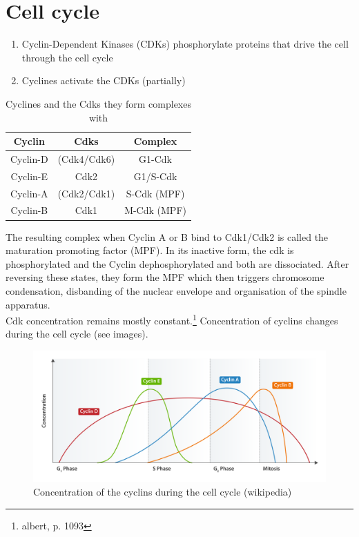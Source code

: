 \documentclass{article}
\begin{document}
	\section{Cell cycle}
	
	\begin{enumerate}[label=\textbullet]
		\item Cyclin-Dependent Kinases (CDKs) phosphorylate proteins that drive the cell through the cell cycle
		\item Cyclines activate the CDKs (partially)
	\end{enumerate}
	
	\begin{table}[h]
		\centering
		\begin{tabular}{|c|c|c|} \hline
			Cyclin & Cdks & Complex \\ \hline
			Cyclin-D & (Cdk4/Cdk6)  & G1-Cdk \\ \hline
			Cyclin-E & Cdk2         & G1/S-Cdk \\ \hline
			Cyclin-A & (Cdk2/Cdk1)  & S-Cdk (MPF) \\ \hline
			Cyclin-B & Cdk1         & M-Cdk (MPF)\\ \hline
		\end{tabular}
		\caption{Cyclines and the Cdks they form complexes with}
	\end{table}

	The resulting complex when Cyclin A or B bind to Cdk1/Cdk2 is called the maturation promoting factor (MPF). In its inactive form, the cdk is phosphorylated and the Cyclin dephosphorylated and both are dissociated. After reversing these states, they form the MPF which then triggers chromosome condensation, disbanding of the nuclear envelope and organisation of the spindle apparatus.\\
	Cdk concentration remains mostly constant.\footnote{albert, p. 1093} Concentration of cyclins changes during the cell cycle (see images).
	
	\begin{figure}[H]
		\centering
		\includegraphics[width=\linewidth]{cyclin_activity_wikipedia.png}
		\caption{Concentration of the cyclins during the cell cycle (wikipedia)}
	\end{figure}
\end{document}
